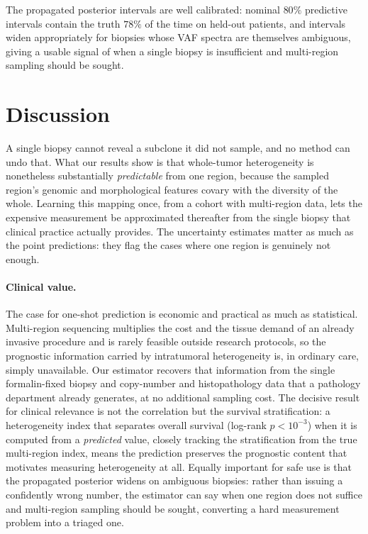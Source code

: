 \documentclass{article}
\begin{document}
The propagated posterior intervals are well calibrated: nominal $80\%$ predictive
intervals contain the truth $78\%$ of the time on held-out patients, and intervals
widen appropriately for biopsies whose VAF spectra are themselves ambiguous, giving a
usable signal of when a single biopsy is insufficient and multi-region sampling should
be sought.

\section{Discussion}

A single biopsy cannot reveal a subclone it did not sample, and no method can undo
that. What our results show is that whole-tumor heterogeneity is nonetheless
substantially \emph{predictable} from one region, because the sampled region's genomic
and morphological features covary with the diversity of the whole. Learning this
mapping once, from a cohort with multi-region data, lets the expensive measurement be
approximated thereafter from the single biopsy that clinical practice actually
provides. The uncertainty estimates matter as much as the point predictions: they flag
the cases where one region is genuinely not enough.

\paragraph{Clinical value.} The case for one-shot prediction is economic and
practical as much as statistical. Multi-region sequencing multiplies the cost and the
tissue demand of an already invasive procedure and is rarely feasible outside research
protocols, so the prognostic information carried by intratumoral heterogeneity is, in
ordinary care, simply unavailable. Our estimator recovers that information from the
single formalin-fixed biopsy and copy-number and histopathology data that a pathology
department already generates, at no additional sampling cost. The decisive result for
clinical relevance is not the correlation but the survival stratification: a
heterogeneity index that separates overall survival (log-rank $p<10^{-3}$) when it is
computed from a \emph{predicted} value, closely tracking the stratification from the
true multi-region index, means the prediction preserves the prognostic content that
motivates measuring heterogeneity at all. Equally important for safe use is that the
propagated posterior widens on ambiguous biopsies: rather than issuing a confidently
wrong number, the estimator can say when one region does not suffice and multi-region
sampling should be sought, converting a hard measurement problem into a triaged one.
\end{document}
